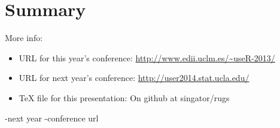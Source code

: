 \documentclass{beamer}
\begin{document}
\section*{Summary}
\begin{frame}
More info:
\begin{itemize}
 \item URL for this year's conference: \url{http://www.edii.uclm.es/~useR-2013/}
 \item URL for next year's conference: \url{http://user2014.stat.ucla.edu/}
 \item TeX file for this presentation: On github at singator/rugs

\end{itemize}
-next year
-conference url
\end{frame}
%
%
%
%
%
\end{document}
